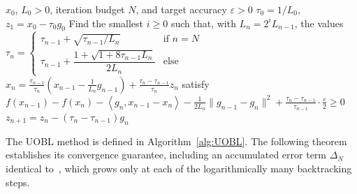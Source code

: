 \documentclass[11pt, hidelinks]{article}
\numberwithin{equation}{section}
\theoremstyle{thmstyletwo}%
\numberwithin{equation}{section}
\newcommand{\eps}{\varepsilon}
\newcommand{\inner}[2]{\left\langle {#1}, {#2} \right\rangle}
\begin{document}
\begin{algorithm}[t]
\caption{Universal Optimized Backtrackable Linesearch method (UOBL)}\label{alg:UOBL}
\begin{algorithmic}
\Input $x_0$, $L_0 > 0$, iteration budget $N$, and target accuracy $\eps > 0$
\Initialize $\tau_0 = 1/L_0$, $z_1 = x_0-\tau_0g_0$
    \State Find the smallest $i \geq 0$ such that, with $L_n = 2^i L_{n-1}$, the values
    \State \quad $\tau_n = \begin{cases} \tau_{n-1}+\sqrt{\tau_{n-1}/{L_{n}}}  & \text{if } n = N \\[0.5em] \tau_{n-1}+\dfrac{1+\sqrt{1+8\tau_{n-1}L_{n}}}{2L_{n}} & \text{else} \end{cases}$
    \State \quad $x_n = \frac{\tau_{n-1}}{\tau_n}\left(x_{n-1}-\frac{1}{L_n}g_{n-1}\right)+\frac{\tau_n-\tau_{n-1}}{\tau_n}z_n$
      \State satisfy $f(x_{n-1})-f(x_n)-\inner{g_n}{x_{n-1}-x_n}-\frac{1}{2L_n}\|g_{n-1}-g_n\|^2 + \frac{\tau_n-\tau_{n-1}}{\tau_{n-1}}\cdot\frac{\eps}{2} \geq 0$
    \State $z_{n+1} = z_n - (\tau_n-\tau_{n-1})g_n$
  
\EndFor
\end{algorithmic}
\end{algorithm}

The UOBL method is defined in Algorithm~\ref{alg:UOBL}. The following theorem establishes its convergence guarantee, including an accumulated error term $\Delta_N$ identical to~\cite[Theorem 6]{OBL}, which grows only at each of the logarithmically many backtracking steps.
\end{document}

